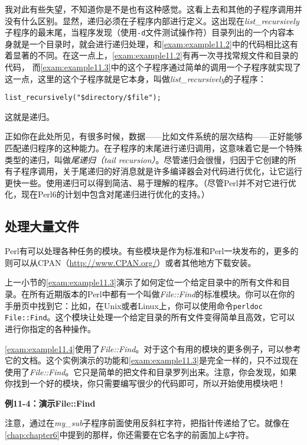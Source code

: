 我对此有些失望，不知道你是不是也有这种感觉。这看上去和其他的子程序调用并没有什么区别。显然，递归必须在子程序内部进行定义。这出现在\textit{list\_recursively}子程序的最末尾，当程序发现（使用\verb|-d|文件测试操作符）目录列出的一个内容本身就是一个目录时，就会进行递归处理，和\autoref{exam:example11.2}中的代码相比这有着显著的不同。在这一点上，\autoref{exam:example11.2}有再一次寻找常规文件和目录的代码，
而\autoref{exam:example11.3}中的这个子程序通过简单的调用一个子程序就实现了这一点，这里的这个子程序就是它本身，叫做\textit{list\_recursively}的子程序：

\begin{lstlisting}
list_recursively("$directory/$file");
\end{lstlisting}

这就是递归。

正如你在此处所见，有很多时候，数据——比如文件系统的层次结构——正好能够匹配递归程序的这种能力。在子程序的末尾进行递归调用，这意味着它是一个特殊类型的递归，叫做\textit{尾递归（tail
recursion）}。尽管递归会很慢，归因于它创建的所有子程序调用，关于尾递归的好消息就是许多编译器会对代码进行优化，让它运行更快一些。使用递归可以得到简洁、易于理解的程序。（尽管Perl并不对它进行优化，现在Perl6的计划中包含对尾递归进行优化的支持。）

\subsection{处理大量文件}
\label{sect:section11.2.3}
Perl有可以处理各种任务的模块。有些模块是作为标准和Perl一块发布的，更多的则可以从CPAN（\href{http://www.CPAN.org/}{http://www.CPAN.org/}）或者其他地方下载安装。

上一小节的\autoref{exam:example11.3}演示了如何定位一个给定目录中的所有文件和目录。在所有近期版本的Perl中都有一个叫做\textit{File::Find}的标准模块。你可以在你的手册页中找到它：比如，在Unix或者Linux上，你可以使用命令\verb|perldoc File::Find|。这个模块让处理一个给定目录的所有文件变得简单且高效，它可以进行你指定的各种操作。

\autoref{exam:example11.4}使用了\textit{File::Find}。对于这个有用的模块的更多例子，可以参考它的文档。这个实例演示的功能和\autoref{exam:example11.3}是完全一样的，只不过现在使用了\textit{File::Find}。它只是简单的把文件和目录罗列出来。注意，你会发现，如果你找到一个好的模块，你只需要编写很少的代码即可，所以开始使用模块吧！

\textbf{例11-4：演示File::Find}


注意，通过在\textit{my\_sub}子程序前面使用反斜杠字符，把指针传递给了它。就像在\autoref{chap:chapter6}中提到的那样，你还需要在它名字的前面加上\verb|&|字符。

